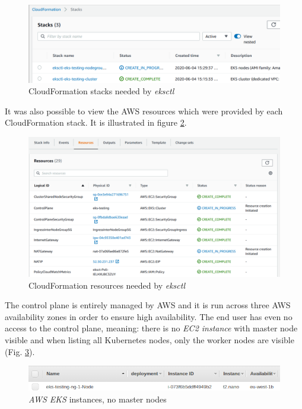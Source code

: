 \begin{figure}[H]
    \centering
    \includegraphics[width=16cm]{figures/eks-cf-stacks-small.png}
    \captionsetup{justification=centering,margin=2cm}
    \caption{CloudFormation stacks needed by \textit{eksctl}}
    \label{eks-cf-stacks}
\end{figure}

It was also possible to view the AWS resources which were provided by each CloudFormation stack. It is illustrated in figure \ref{eks-cf-resources}.
\begin{figure}[H]
    \centering
    \includegraphics[width=16cm]{figures/eks-cf-resources.png}
    \captionsetup{justification=centering,margin=2cm}
    \caption{CloudFormation resources needed by \textit{eksctl}}
    \label{eks-cf-resources}
\end{figure}

The control plane is entirely managed by AWS and it is run across three AWS availability zones in order to ensure high availability. The end user has even no access to the control plane, meaning: there is no \textit{EC2 instance} with master node visible and when listing all Kubernetes nodes, only the worker nodes are visible (Fig. \ref{eks-on-aws-node}).
\begin{figure}[H]
    \centering
    \includegraphics[width=16cm]{figures/eks-on-aws-node-small.png}
    \captionsetup{justification=centering,margin=2cm}
    \caption{\textit{AWS EKS} instances, no master nodes}
    \label{eks-on-aws-node}
\end{figure}

